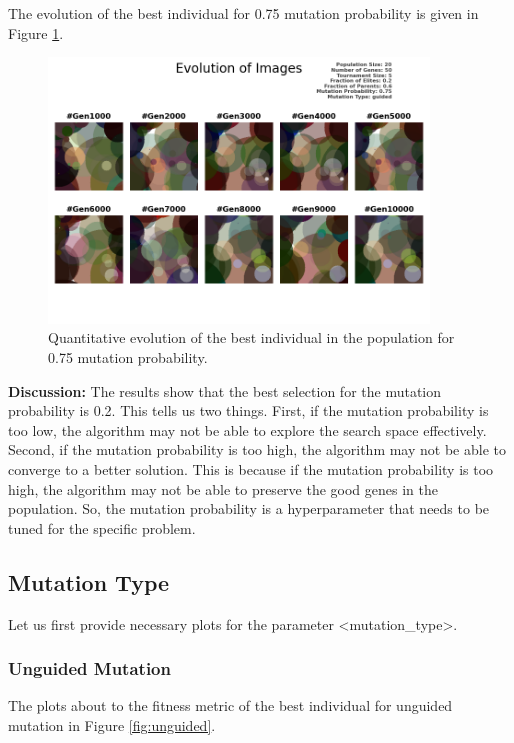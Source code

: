 \documentclass{assignment}
\begin{document}
The evolution of the best individual for 0.75 mutation probability is given in Figure \ref{fig:0.75mutation_image}.
\begin{figure}[!htb]
    \centering
    \includegraphics[width=0.9\textwidth]{figures/images_output_20_50_5_0.2_0.6_0.75_guided.png}
    \caption{Quantitative evolution of the best individual in the population for 0.75 mutation probability.}
    \label{fig:0.75mutation_image}
\end{figure}

\textbf{Discussion:} The results show that the best selection for the mutation probability is 0.2. This tells us two things. First, if the mutation probability is too low, the algorithm may not be able to explore the search space effectively. Second, if the mutation probability is too high, the algorithm may not be able to converge to a better solution. This is because if the mutation probability is too high, the algorithm may not be able to preserve the good genes in the population. So, the mutation probability is a hyperparameter that needs to be tuned for the specific problem.

\subsection{Mutation Type}

Let us first provide necessary plots for the parameter \textless{}mutation\_type\textgreater{}.

\subsubsection{Unguided Mutation}
The plots about to the fitness metric of the best individual for unguided mutation in Figure \ref{fig:unguided}.
\end{document}
